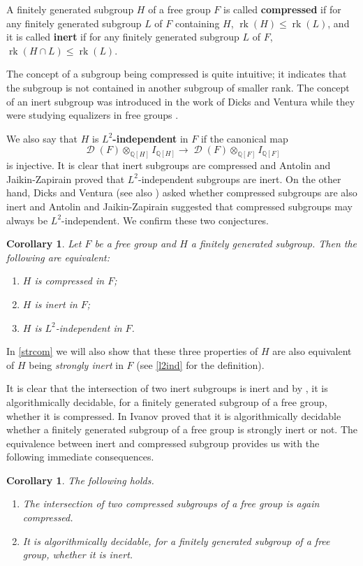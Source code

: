 \documentclass{amsart}
\newtheorem{cor}[lem]{Corollary}
\theoremstyle{definition}
\theoremstyle{remark}
\DeclareMathOperator{\D}{\mathcal D}
\DeclareMathOperator{\rk}{rk}
\newcommand{\Q}{\mathbb{Q}}
\begin{document}
A finitely generated subgroup $H$ of a free group $F$ is called {\bf compressed} if for any finitely generated subgroup $L$ of $F$ containing $H$, $\rk(H)\le \rk(L)$, and it is called {\bf inert} if for any finitely generated subgroup $L$ of $F$, $\rk(H\cap L)\le \rk(L)$. 

The concept of a subgroup being compressed is quite intuitive; it indicates that the subgroup is not contained in another subgroup of smaller rank. The concept of an inert subgroup was introduced in the work of Dicks and Ventura while they were studying equalizers in free groups \cite{DV96}.

We also say that $H$ is {\bf $L^2$-independent} in $F$  if 
 the canonical map $$\D(F)\otimes_{\Q[H]}I_{\Q[H]}\to \D(F)\otimes_{\Q[F]}I_{\Q[F]}$$ is injective. 
 It is clear that   inert subgroups are compressed and Antolin and Jaikin-Zapirain \cite{AJ22} proved that $L^2$-independent subgroups are inert. On the other hand, Dicks and Ventura \cite[Problem 1]{DV96} (see also \cite[Problem 19.102]{Kou}) asked whether  compressed subgroups are also inert and Antolin and Jaikin-Zapirain \cite[Question 2]{AJ22}  suggested that compressed  subgroups may  always be  $L^2$-independent. We confirm these two conjectures.
\begin{cor}\label{inertcompressed}
Let $F$ be a free group and $H$ a finitely generated subgroup. Then the following are equivalent:
\begin{enumerate}
\item $H$ is compressed in $F$;
\item $H$ is inert in $F$;
\item $H$ is $L^2$-independent in $F$.
\end{enumerate}
\end{cor}
In \cref{strcom} we will also show that these three properties of $H$  are also equivalent of $H$ being {\it strongly inert} in $F$ (see  \cref{l2ind} for the definition).

It is clear that the intersection of two inert subgroups is inert and by \cite[Theorem 3.9]{MVW07}, it is 	algorithmically decidable,  for a finitely generated subgroup of a free group, whether it is compressed. In \cite{Iv18} Ivanov proved   that it is algorithmically decidable whether a finitely generated subgroup of a free
group is strongly inert or not. The equivalence between inert and compressed subgroup provides us with the following immediate consequences.

\begin{cor} The following holds.
\begin{enumerate}
\item \cite[Problem 19.103]{Kou} The intersection of two compressed subgroups of a free group is again compressed.
\item   \cite[Problem 19.104]{Kou} It is algorithmically decidable, for a finitely generated subgroup of a free group, whether it is inert.
\end{enumerate}
\end{cor}
  
\end{document}
